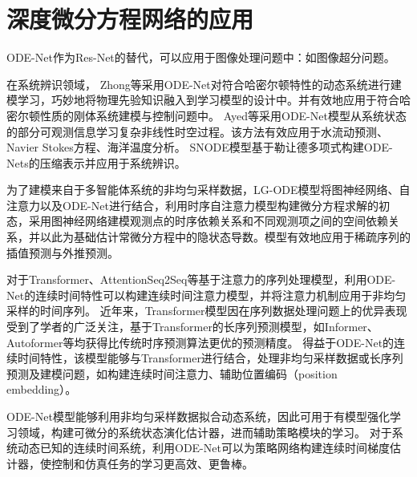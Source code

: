 \section{深度微分方程网络的应用}
ODE-Net作为Res-Net的替代，可以应用于图像处理问题中：如图像超分问题\cite{OISR,jia2019focnet}。

在系统辨识领域，
Zhong等\cite{zhong2019symplectic}采用ODE-Net对符合哈密尔顿特性的动态系统进行建模学习，巧妙地将物理先验知识融入到学习模型的设计中。并有效地应用于符合哈密尔顿性质的刚体系统建模与控制问题中。
Ayed等\cite{ayed2019learning}采用ODE-Net模型从系统状态的部分可观测信息学习复杂非线性时空过程。该方法有效应用于水流动预测、Navier Stokes方程、海洋温度分析。
SNODE\cite{Quaglino2019}模型基于勒让德多项式构建ODE-Nets的压缩表示并应用于系统辨识。

为了建模来自于多智能体系统的非均匀采样数据，LG-ODE模型\cite{Huang2020}将图神经网络、自注意力以及ODE-Net进行结合，利用时序自注意力模型构建微分方程求解的初态，采用图神经网络建模观测点的时序依赖关系和不同观测项之间的空间依赖关系，并以此为基础估计常微分方程中的隐状态导数。模型有效地应用于稀疏序列的插值预测与外推预测。


对于Transformer、AttentionSeq2Seq等基于注意力的序列处理模型，利用ODE-Net的连续时间特性可以构建连续时间注意力模型\cite{chen2021continuous}，并将注意力机制应用于非均匀采样的时间序列。
近年来，Transformer模型\cite{Vaswani2017}因在序列数据处理问题上的优异表现受到了学者的广泛关注，基于Transformer的长序列预测模型，如Informer\cite{Zhou2020}、Autoformer\cite{Wu2021}等均获得比传统时序预测算法更优的预测精度。
得益于ODE-Net的连续时间特性，该模型能够与Transformer进行结合，处理非均匀采样数据或长序列预测及建模问题，如构建连续时间注意力\cite{chen2021continuous}、辅助位置编码（position embedding）\cite{Liu2020}。

ODE-Net模型能够利用非均匀采样数据拟合动态系统，因此可用于有模型强化学习\cite{Yildiz2021}领域，构建可微分的系统状态演化估计器，进而辅助策略模块的学习。
对于系统动态已知的连续时间系统，利用ODE-Net可以为策略网络构建连续时间梯度估计器\cite{Ainsworth2020}，使控制和仿真任务的学习更高效、更鲁棒。




